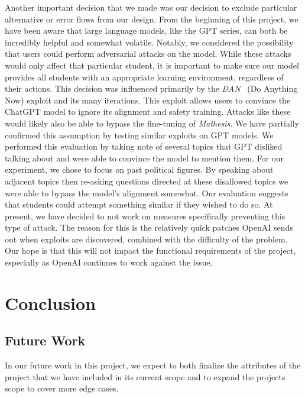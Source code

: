 \documentclass[12pt,a4paper]{article}
\begin{document}
    Another important decision that we made was our decision to exclude particular alternative or
    error flows from our design.  From the beginning of this project, we have been aware that
    large language models, like the GPT series, can both be incredibly helpful and somewhat volatile.
    Notably, we considered the possibility that users could perform adversarial attacks on the model.
    While these attacks would only affect that particular student, it is important to make sure
    our model provides all students with an appropriate learning environment, regardless of their actions.
    This decision was influenced primarily by the \textit{DAN}~\cite{danThread} (Do Anything Now)
    exploit and its many iterations.  This exploit allows users to convince the ChatGPT model to
    ignore its alignment and safety training.  Attacks like these would likely also be able to
    bypass the fine-tuning of \textit{Mathesis}.  We have partially confirmed this assumption by
    testing similar exploits on GPT models.  We performed this evaluation by taking note of several
    topics that GPT disliked talking about and were able to convince the model to mention them.  For
    our experiment, we chose to focus on past political figures.  By speaking about adjacent topics
    then re-asking questions directed at these disallowed topics we were able to bypass the model's
    alignment somewhat.  Our evaluation suggests that students could attempt something
    similar if they wished to do so.  At present, we have decided to not work on measures
    specifically preventing this type of attack.  The reason for this is the relatively quick
    patches OpenAI sends out when exploits are discovered, combined with the difficulty of the
    problem.  Our hope is that this will not impact the functional requirements of the project,
    especially as OpenAI continues to work against the issue.

    \section{Conclusion}

    \subsection{Future Work}
    In our future work in this project, we expect to both finalize the attributes of the project that
    we have included in its current scope and to expand the projects scope to cover more edge cases.
\end{document}

